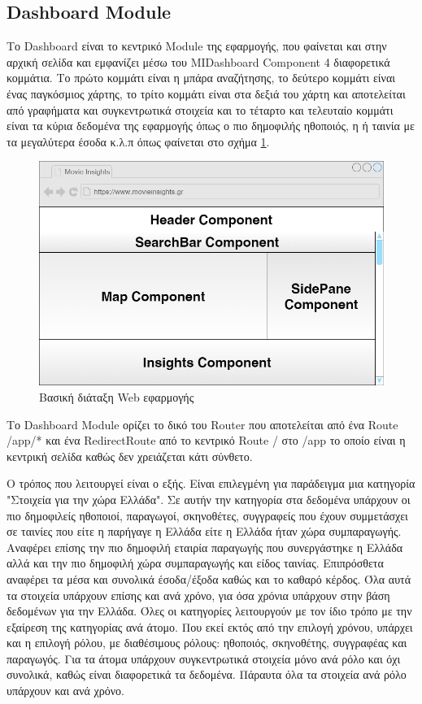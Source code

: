 \subsection{Dashboard Module}
Το Dashboard είναι το κεντρικό Module της εφαρμογής, που φαίνεται και στην αρχική σελίδα και εμφανίζει μέσω του MIDashboard Component 4 διαφορετικά κομμάτια. Το πρώτο κομμάτι είναι η μπάρα αναζήτησης, το δεύτερο κομμάτι είναι ένας παγκόσμιος χάρτης, το τρίτο κομμάτι είναι στα δεξιά του χάρτη και αποτελείται από γραφήματα και συγκεντρωτικά στοιχεία και το τέταρτο και τελευταίο κομμάτι είναι τα κύρια δεδομένα της εφαρμογής όπως ο πιο δημοφιλής ηθοποιός, η ή ταινία με τα μεγαλύτερα έσοδα κ.λ.π όπως φαίνεται στο σχήμα \ref{wire:dashboard}.

\begin{figure}[H]
  \centering
  \includegraphics[width=145mm]{Chapters/5 - Architecture/Client/Images/dashboard_struct.png}
  \caption{Βασική διάταξη Web εφαρμογής}
  \label{wire:dashboard}
\end{figure}

Το Dashboard Module ορίζει το δικό του Router που αποτελείται από ένα Route /app/* και ένα RedirectRoute από το κεντρικό Route / στο /app το οποίο είναι η κεντρική σελίδα καθώς δεν χρειάζεται κάτι σύνθετο. 

Ο τρόπος που λειτουργεί είναι ο εξής. Είναι επιλεγμένη για παράδειγμα μια κατηγορία "Στοιχεία για την χώρα Ελλάδα".
Σε αυτήν την κατηγορία στα δεδομένα υπάρχουν οι πιο δημοφιλείς ηθοποιοί, παραγωγοί, σκηνοθέτες, συγγραφείς που έχουν συμμετάσχει σε ταινίες που είτε η παρήγαγε η Ελλάδα είτε η Ελλάδα ήταν χώρα συμπαραγωγής. Αναφέρει επίσης την πιο δημοφιλή εταιρία παραγωγής που συνεργάστηκε η Ελλάδα αλλά και την πιο δημοφιλή χώρα συμπαραγωγής και είδος ταινίας. Επιπρόσθετα αναφέρει τα μέσα και συνολικά έσοδα/έξοδα καθώς και το καθαρό κέρδος. Όλα αυτά τα στοιχεία υπάρχουν επίσης και ανά χρόνο, για όσα χρόνια υπάρχουν στην βάση δεδομένων για την Ελλάδα. Όλες οι κατηγορίες λειτουργούν με τον ίδιο τρόπο με την εξαίρεση της κατηγορίας ανά άτομο. Που εκεί εκτός από την επιλογή χρόνου, υπάρχει και η επιλογή ρόλου, με διαθέσιμους ρόλους: ηθοποιός, σκηνοθέτης, συγγραφέας και παραγωγός. Για τα άτομα υπάρχουν συγκεντρωτικά στοιχεία μόνο ανά ρόλο και όχι συνολικά, καθώς είναι διαφορετικά τα δεδομένα. Πάραυτα όλα τα στοιχεία ανά ρόλο υπάρχουν και ανά χρόνο.

